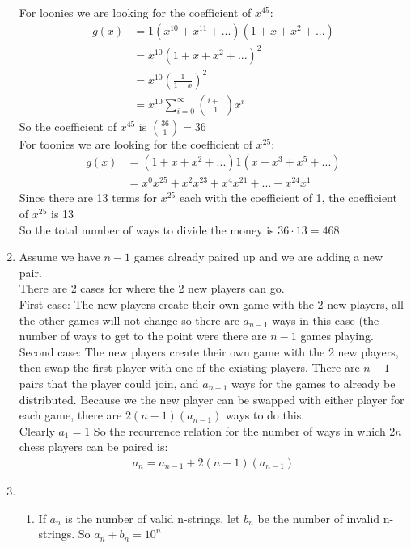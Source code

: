 \documentclass[11pt]{article}
\begin{document}
\begin{enumerate}[]
For loonies we are looking for the coefficient of $x^{45}$:
\begin{align}
	g(x) &= 1(x^{10}+x^{11}+...)(1+x+x^2+...)\nonumber\\
	&=  x^{10}(1+x+x^2+...)^2 \nonumber\\
	&= x^{10}(\frac{1}{1-x})^2 \nonumber\\
	&= x^{10}\sum_{i=0}^\infty\binom{i+1}{1}x^i\nonumber
\end{align}
So the coefficient of $x^{45}$ is $\binom{36}{1}=36$\\
For toonies we are looking for the coefficient of $x^{25}$:
\begin{align}
	g(x) &= (1+x+x^2+...)1(x+x^3+x^5+...)\nonumber\\
	&=  x^{0}x^{25} +x^{2}x^{23} + x^{4}x^{21} + ... + x^{24}x^{1} \nonumber
\end{align}
Since there are 13 terms for $x^{25}$ each with the coefficient of 1, the coefficient of $x^{25}$ is 13\\
So the total number of ways to divide the money is $36\cdot 13 = 468$
\item Assume we have $n-1$ games already paired up and we are adding a new pair.\\
There are 2 cases for where the 2 new players can go.\\
First case: The new players create their own game with the 2 new players, all the other games will not change so there are $a_{n-1}$ ways in this case (the number of ways to get to the point were there are $n-1$ games playing.\\
Second case: The new players create their own game with the 2 new players, then swap the first player with one of the existing players. There are $n-1$ pairs that the player could join, and $a_{n-1}$ ways for the games to already be distributed. Because we the new player can be swapped with either player for each game, there are $2(n-1)(a_{n-1})$ ways to do this.\\
Clearly $a_1 = 1$
So the recurrence relation for the number of ways in which $2n$ chess players can be paired is:
\begin{gather}
	a_n = a_{n-1} + 2(n-1)(a_{n-1}) \nonumber
\end{gather}
\item
	\begin{enumerate}
	\item If $a_n$ is the number of valid n-strings, let $b_n$ be the number of invalid n-strings. So $a_n + b_n = 10^n$\\

\end{enumerate}
\end{enumerate}
\end{document}
